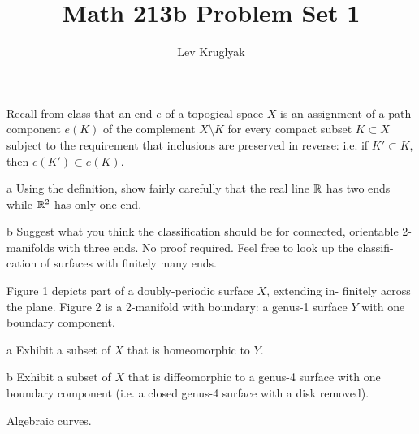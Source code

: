 \documentclass{pset}
\title{Math 213b Problem Set 1}
\author{Lev Kruglyak}
\begin{document}
\maketitle

\begin{problem}{1}
  Recall from class that an end $e$ of a topogical space $X$ is an assignment of a path component $e(K)$ of the complement $X\setminus K$ for every compact subset $K\subset X$ subject to the requirement that inclusions are preserved in reverse: i.e. if $K'\subset K$, then $e(K')\subset e(K)$.
\end{problem}


\begin{parts}
  \begin{part}{a}
    Using the definition, show fairly carefully that the real line $\mathbb{R}$ has two ends while $\mathbb{R}^2$ has only one end.
  \end{part}

  \begin{part}{b}
    Suggest what you think the classification should be for connected, orientable
    2-manifolds with three ends. No proof required. Feel free to look up the classifi-
    cation of surfaces with finitely many ends.
  \end{part}
\end{parts}

\begin{problem}{2}
  \todo{[figures]} Figure 1 depicts part of a doubly-periodic surface $X$, extending in-
finitely across the plane. Figure 2 is a 2-manifold with boundary: a
genus-1 surface $Y$ with one boundary component.
\end{problem}

\begin{parts}
  \begin{part}{a}
    Exhibit a subset of $X$ that is homeomorphic to $Y$.
  \end{part}

  \begin{part}{b}
    Exhibit a subset of $X$ that is diffeomorphic to a genus-4 surface with one boundary component (i.e. a closed genus-4 surface with a disk removed).
  \end{part}
\end{parts}

\begin{problem}{3}
  Algebraic curves.
\end{problem}
\end{document}
